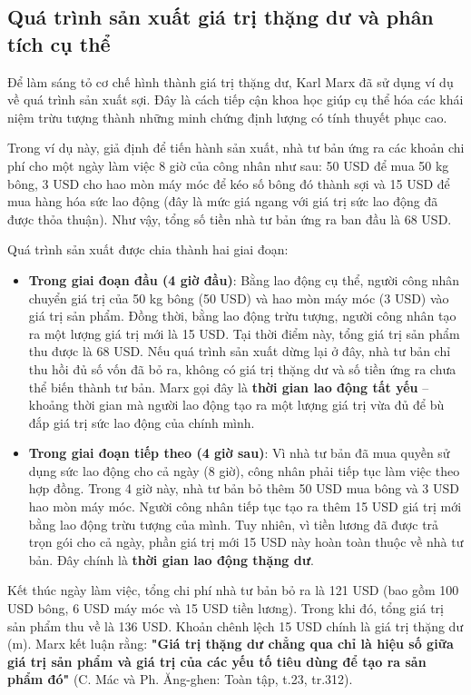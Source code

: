 \subsection{Quá trình sản xuất giá trị thặng dư và phân tích cụ thể}
Để làm sáng tỏ cơ chế hình thành giá trị thặng dư, Karl Marx đã sử dụng ví dụ về quá trình sản xuất sợi. Đây là cách tiếp cận khoa học giúp cụ thể hóa các khái niệm trừu tượng thành những minh chứng định lượng có tính thuyết phục cao.

Trong ví dụ này, giả định để tiến hành sản xuất, nhà tư bản ứng ra các khoản chi phí cho một ngày làm việc 8 giờ của công nhân như sau: 50 USD để mua 50 kg bông, 3 USD cho hao mòn máy móc để kéo số bông đó thành sợi và 15 USD để mua hàng hóa sức lao động (đây là mức giá ngang với giá trị sức lao động đã được thỏa thuận). Như vậy, tổng số tiền nhà tư bản ứng ra ban đầu là 68 USD.

Quá trình sản xuất được chia thành hai giai đoạn:
\begin{itemize}
    \item \textbf{Trong giai đoạn đầu (4 giờ đầu)}: Bằng lao động cụ thể, người công nhân chuyển giá trị của 50 kg bông (50 USD) và hao mòn máy móc (3 USD) vào giá trị sản phẩm. Đồng thời, bằng lao động trừu tượng, người công nhân tạo ra một lượng giá trị mới là 15 USD. Tại thời điểm này, tổng giá trị sản phẩm thu được là 68 USD. Nếu quá trình sản xuất dừng lại ở đây, nhà tư bản chỉ thu hồi đủ số vốn đã bỏ ra, không có giá trị thặng dư và số tiền ứng ra chưa thể biến thành tư bản. Marx gọi đây là \textbf{thời gian lao động tất yếu} – khoảng thời gian mà người lao động tạo ra một lượng giá trị vừa đủ để bù đắp giá trị sức lao động của chính mình.
    \item \textbf{Trong giai đoạn tiếp theo (4 giờ sau)}: Vì nhà tư bản đã mua quyền sử dụng sức lao động cho cả ngày (8 giờ), công nhân phải tiếp tục làm việc theo hợp đồng. Trong 4 giờ này, nhà tư bản bỏ thêm 50 USD mua bông và 3 USD hao mòn máy móc. Người công nhân tiếp tục tạo ra thêm 15 USD giá trị mới bằng lao động trừu tượng của mình. Tuy nhiên, vì tiền lương đã được trả trọn gói cho cả ngày, phần giá trị mới 15 USD này hoàn toàn thuộc về nhà tư bản. Đây chính là \textbf{thời gian lao động thặng dư}.
\end{itemize}
Kết thúc ngày làm việc, tổng chi phí nhà tư bản bỏ ra là 121 USD (bao gồm 100 USD bông, 6 USD máy móc và 15 USD tiền lương). Trong khi đó, tổng giá trị sản phẩm thu về là 136 USD. Khoản chênh lệch 15 USD chính là giá trị thặng dư (m). Marx kết luận rằng: \textbf{"Giá trị thặng dư chẳng qua chỉ là hiệu số giữa giá trị sản phẩm và giá trị của các yếu tố tiêu dùng để tạo ra sản phẩm đó"} (C. Mác và Ph. Ăng-ghen: Toàn tập, t.23, tr.312).

